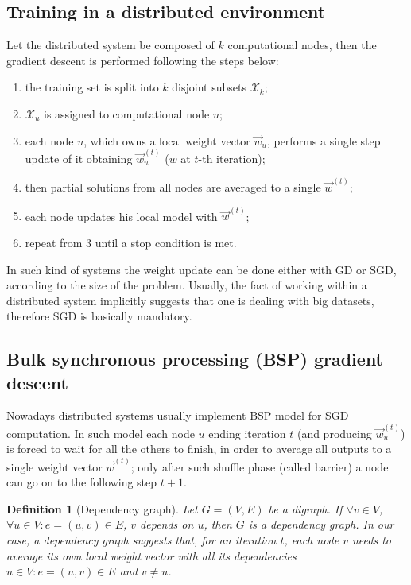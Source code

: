 \documentclass[a4paper,12pt]{article}
\theoremstyle{newplanestyle}
\theoremstyle{newdefinitionstyle}
\newtheorem*{newdef*}{Definition}
\theoremstyle{newprovestyle}
\begin{document}
\subsection*{Training in a distributed environment}
Let the distributed system be composed of $k$ computational nodes, then the gradient descent is performed following the steps below:
\begin{enumerate}
\item the training set is split into $k$ disjoint subsets $\mathcal{X}_k$;
\item $\mathcal{X}_u$ is assigned to computational node $u$;
\item each node $u$, which owns a local weight vector $\vec{w}_u$, performs a single step update of it obtaining $\vec{w}^{(t)}_u$ ($w$ at $t$-th iteration);
\item then partial solutions from all nodes are averaged to a single $\vec{w}^{(t)}$;
\item each node updates his local model with $\vec{w}^{(t)}$;
\item repeat from 3 until a stop condition is met.
\end{enumerate}
In such kind of systems the weight update can be done either with GD or SGD, according to the size of the problem. Usually, the fact of working within a distributed system implicitly suggests that one is dealing with big datasets, therefore SGD is basically mandatory.


\subsection*{Bulk synchronous processing (BSP) gradient descent}
Nowadays distributed systems usually implement BSP model for SGD computation. In such model each node $u$ ending iteration $t$ (and producing $\vec{w}^{(t)}_u$) is forced to wait for all the others to finish, in order to average all outputs to a single weight vector $\vec{w}^{(t)}$; only after such shuffle phase (called barrier) a node can go on to the following step $t+1$.

\begin{newdef*}[Dependency graph]
Let $G=(V,E)$ be a digraph. If $\forall v \in V$, $\forall u \in V : e=(u,v) \in E$, $v$ depends on $u$, then $G$ is a dependency graph. In our case, a dependency graph suggests that, for an iteration $t$, each node $v$ needs to average its own local weight vector with all its dependencies $u \in V : e=(u,v) \in E$ and $v \neq u$.
\end{newdef*}
\end{document}
